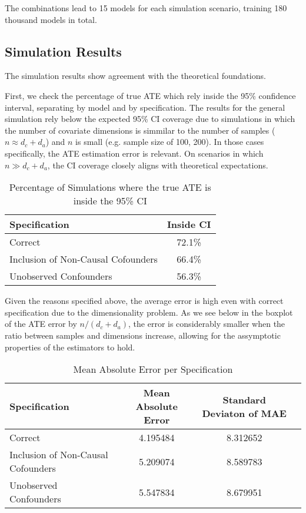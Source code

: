 \documentclass{article}
\numberwithin{equation}{section}
\begin{document}
The combinations lead to 15 models for each simulation scenario, training 180 thousand models in total.

\subsection{Simulation Results}

The simulation results show agreement with the theoretical foundations.

First, we check the percentage of true ATE which rely inside the 95\% confidence interval, separating by model and by specification. The results for the general simulation rely below the expected 95\% CI coverage due to simulations in which the number of covariate dimensions is simmilar to the number of samples ($n \approx d_c + d_a$) and $n$ is small (e.g. sample size of 100, 200). In those cases specifically, the ATE estimation error is relevant. On scenarios in which $n \gg d_c + d_a$, the CI coverage closely aligns with theoretical expectations.

\begin{table}[H]
    \centering
    \begin{tabular}{lc}
        \toprule
        Specification & Inside CI \\
        \midrule
        Correct & 72.1\% \\
        Inclusion of Non-Causal Cofounders & 66.4\% \\
        Unobserved Confounders & 56.3\% \\
        \bottomrule
    \end{tabular}
    \caption{Percentage of Simulations where the true ATE is inside the 95\% CI}
\end{table}

Given the reasons specified above, the average error is high even with correct specification due to the dimensionality problem. As we see below in the boxplot of the ATE error by $n / (d_c + d_a)$, the error is considerably smaller when the ratio between samples and dimensions increase, allowing for the assymptotic properties of the estimators to hold.

\begin{table}[H]
    \centering
    \begin{tabular}{lccc}
        \toprule
        Specification & Mean Absolute Error & Standard Deviaton of MAE \\
        \midrule
        Correct & 4.195484 & 8.312652 \\
        Inclusion of Non-Causal Cofounders & 5.209074 & 8.589783 \\
        Unobserved Confounders & 5.547834 & 8.679951 \\
        \bottomrule
    \end{tabular}
    \caption{Mean Absolute Error per Specification}
\end{table}
\end{document}
